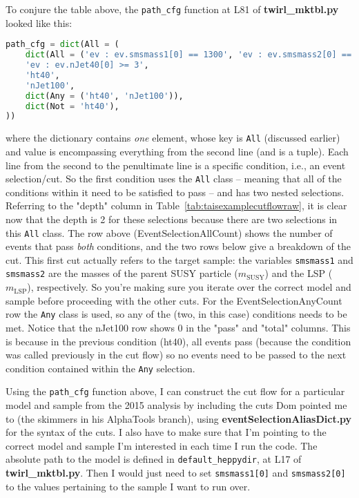 To conjure the table above, the \verb!path_cfg! function at L81 of \textbf{twirl\_mktbl.py} looked like this:

\begin{lstlisting}[belowskip=-0.7cm, language=python, numbers=none]
path_cfg = dict(All = (
	dict(All = ('ev : ev.smsmass1[0] == 1300', 'ev : ev.smsmass2[0] == 1050')),
	'ev : ev.nJet40[0] >= 3',
	'ht40',
	'nJet100',
	dict(Any = ('ht40', 'nJet100')),
	dict(Not = 'ht40'),
))
\end{lstlisting}

where the dictionary contains \emph{one} element, whose key is \verb!All! (discussed earlier) and value is encompassing everything from the second line (and is a tuple). Each line from the second to the penultimate line is a specific condition, i.e., an event selection/cut. So the first condition uses the \verb!All! class -- meaning that all of the conditions within it need to be satisfied to pass -- and has two nested selections. Referring to the "depth" column in Table~\ref{tab:taisexamplecutflowraw}, it is clear now that the depth is 2 for these selections because there are two selections in this \verb!All! class. The row above (EventSelectionAllCount) shows the number of events that pass \emph{both} conditions, and the two rows below give a breakdown of the cut. This first cut actually refers to the target sample: the variables \verb!smsmass1! and \verb!smsmass2! are the masses of the parent SUSY particle ($m_{\mathrm{SUSY}}$) and the LSP ($m_{\mathrm{LSP}}$), respectively. So you're making sure you iterate over the correct model and sample before proceeding with the other cuts. For the EventSelectionAnyCount row the \verb!Any! class is used, so any of the (two, in this case) conditions needs to be met. Notice that the nJet100 row shows 0 in the "pass" and "total" columns. This is because in the previous condition (ht40), all events pass (because the condition was called previously in the cut flow) so no events need to be passed to the next condition contained within the \verb!Any! selection.

Using the \verb!path_cfg! function above, I can construct the cut flow for a particular model and sample from the 2015 analysis by including the cuts Dom pointed me to (the skimmers in his AlphaTools branch), using \textbf{eventSelectionAliasDict.py} for the syntax of the cuts. I also have to make sure that I'm pointing to the correct model and sample I'm interested in each time I run the code. The absolute path to the model is defined in \verb!default_heppydir!, at L17 of \textbf{twirl\_mktbl.py}. Then I would just need to set \verb!smsmass1[0]! and \verb!smsmass2[0]! to the values pertaining to the sample I want to run over.

